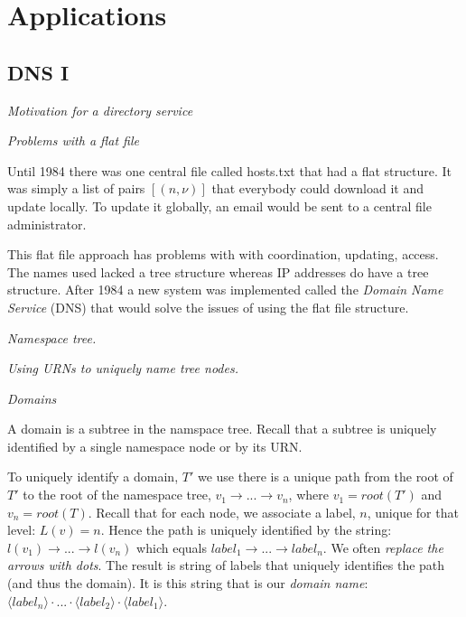\chapter{Applications}


\section{DNS I}


\frmrule 

\textit{Motivation for a directory service}

\frmrule 

\textit{Problems with a flat file}

Until 1984 there was one central file 
called hosts.txt that had a flat structure. 
It was simply a list of pairs $[(n,\nu)]$ 
that everybody could download it and update locally. 
To update it globally, an email would be 
sent to a central file administrator. 

This flat file approach has problems with 
with coordination, updating, access. The names used
lacked a tree structure whereas IP addresses 
do have a tree structure.
After 1984 a new system was implemented called 
the \textit{Domain Name Service} (DNS) that would 
solve the issues of using the flat file structure. 

\frmrule 

\textit{Namespace tree.}


\frmrule 

\textit{Using URNs to uniquely name tree nodes.}


\frmrule 

\textit{Domains}

A domain is a subtree in the namspace tree.
Recall that a subtree is uniquely identified by 
a single namespace node or by its URN. 


\frmrule 



To uniquely identify a domain, $T'$ we use there is a unique path from the 
root of $T'$ to the root of the namespace tree, $v_1 \rightarrow ... \rightarrow v_n$, where 
$v_1 = root(T')$ and $v_n = root(T)$. 
Recall that for each node, we associate a label, $n$, unique for that level: $L(v) = n$. 
Hence the path is uniquely 
identified by the string: $l(v_1) \rightarrow ... \rightarrow l(v_n)$ 
which equals $label_1 \rightarrow ... \rightarrow label_n$. 
We often \textit{replace the arrows with dots}. 
The result is string of labels that uniquely identifies the path (and thus the domain). 
It is this string that is our \textit{domain name}: 
$\langle label_n \rangle \cdot ... \cdot \langle label_2 \rangle \cdot \langle label_1 \rangle$.

